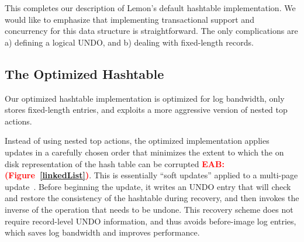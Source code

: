 \documentclass[10pt,letterpaper,twocolumn,english]{article}
\newcommand{\yad}{Lemon\xspace}
\newcommand{\eab}[1]{\textcolor{red}{\bf EAB: #1}}
\begin{document}

This completes our description of \yad's default hashtable
implementation.  We would like to emphasize that implementing
transactional support and concurrency for this data structure is
straightforward.  The only complications are a) defining a logical
UNDO, and b) dealing with fixed-length records.




\subsection{The Optimized Hashtable}

Our optimized hashtable implementation is optimized for log bandwidth,
only stores fixed-length entries, and exploits a more aggressive
version of nested top actions.

Instead of using nested top actions, the optimized implementation
applies updates in a carefully chosen order that minimizes the extent
to which the on disk representation of the hash table can be corrupted
\eab{(Figure~\ref{linkedList})}. This is essentially ``soft updates''
applied to a multi-page update~\cite{soft-updates}.  Before beginning
the update, it writes an UNDO entry that will check and restore the
consistency of the hashtable during recovery, and then invokes the
inverse of the operation that needs to be undone.  This recovery
scheme does not require record-level UNDO information, and thus avoids
before-image log entries, which saves log bandwidth and improves
performance.
\end{document}
